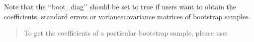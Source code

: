 \documentclass[letterpaper,10pt,english]{sphinxmanual}
\begin{document}
\sphinxAtStartPar
Note that the ‘‘boot\_diag’’ should be set to true if users want to obtain the coefficients, standard errors or variance\sphinxhyphen{}covariance matrices
of bootstrap samples.
\begin{quote}

\sphinxAtStartPar
To get the coefficients of a particular bootstrap sample, please use:
\begin{quote}

\begin{sphinxVerbatim}[commandchars=\\\{\}]
\PYG{p}{[}\PYG{p}{]}\PYG{p}{[}\PYG{p}{]}
\end{sphinxVerbatim}
\end{quote}
\end{quote}
\end{document}
